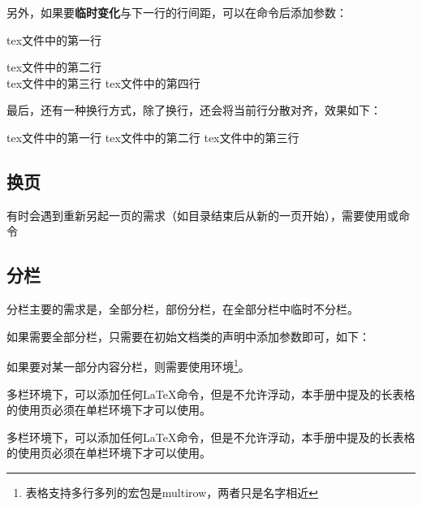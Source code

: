     另外，如果要\textbf{临时变化}与下一行的行间距，可以在\highunderline{\textbackslash{}\textbackslash{}}命令后添加\highunderline{[offset]}参数：
    \begin{texshow}
        tex文件中的第一行

        tex文件中的第二行\\[1em]
        tex文件中的第三行\newline %
        tex文件中的第四行
    \end{texshow}

    最后，还有一种换行方式，除了换行，还会将当前行分散对齐，效果如下：
    \begin{texshow}
        tex文件中的第一行\linebreak
        tex文件中的第二行\linebreak
        tex文件中的第三行
    \end{texshow}

    \subsection{换页}

    有时会遇到重新另起一页的需求（如目录结束后从新的一页开始），需要使用或命令

    \begin{texcode}
        \tableofcontents
        \newpage
    \end{texcode}


    \subsection{分栏}
    分栏主要的需求是，全部分栏，部份分栏，在全部分栏中临时不分栏。

    如果需要全部分栏，只需要在初始文档类的声明中添加参数即可，如下：

    如果要对某一部分内容分栏，则需要使用环境\footnote{表格支持多行多列的宏包是multirow，两者只是名字相近}。

    \begin{texshow}
        \begin{multicols}{2}%
            多栏环境下，可以添加任何\LaTeX{}命令，但是不允许浮动，本手册中提及的长表格的使用页必须在单栏环境下才可以使用。
        \end{multicols}

        \begin{multicols}{3}
            多栏环境下，可以添加任何\LaTeX{}命令，但是不允许浮动，本手册中提及的长表格的使用页必须在单栏环境下才可以使用。
        \end{multicols}
    \end{texshow}

